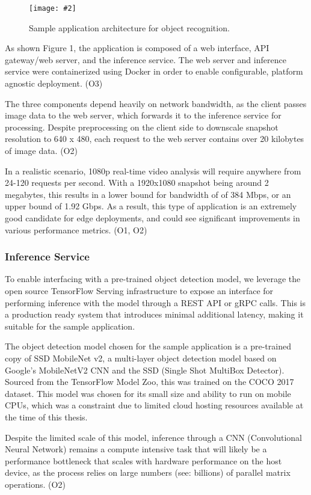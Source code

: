 \documentclass[11pt]{article}
\newcommand{\capfigure}[3][0.5] {
    \begin{figure}[H]
    \centering
    \texttt{[image: \#2]}
    \caption{#3}
    \end{figure}
}
\begin{document}
\capfigure[0.75]{images/applicationdesign1}{Sample application architecture for object recognition.}

As shown Figure 1, the application is composed of a web interface, API gateway/web server, 
and the inference service. The web server and inference service were containerized using Docker 
in order to enable configurable, platform agnostic deployment. (O3)\newline

The three components depend heavily on network bandwidth, as the client passes image data to the
web server, which forwards it to the inference service for processing. Despite preprocessing on the 
client side to downscale snapshot resolution to 640 x 480, each request to the web server contains 
over 20 kilobytes of image data. (O2) \newline

In a realistic scenario, 1080p real-time video analysis will require anywhere from 24-120 requests 
per second. With a 1920x1080 snapshot being around 2 megabytes, this results in a lower bound for 
bandwidth of of 384 Mbps, or an upper bound of 1.92 Gbps. As a result, this type of application is 
an extremely good candidate for edge deployments, and could see significant improvements in
various performance metrics. (O1, O2)

\subsubsection{Inference Service}
To enable interfacing with a pre-trained object detection model, we leverage the open source
TensorFlow Serving infrastructure to expose an interface for performing inference with the model 
through a REST API or gRPC calls. This is a production ready system that introduces minimal
additional latency, making it suitable for the sample application.\newline

The object detection model chosen for the sample application is a pre-trained copy of SSD 
MobileNet v2, a multi-layer object detection model based on Google's MobileNetV2 CNN and the SSD 
(Single Shot MultiBox Detector). Sourced from the TensorFlow Model Zoo, this was trained on the 
COCO 2017 dataset. This model was chosen for its small size and ability to run on mobile CPUs, 
which was a constraint due to limited cloud hosting resources available at the time of this thesis.
\newline

Despite the limited scale of this model, inference through a CNN (Convolutional Neural Network) 
remains a compute intensive task that will likely be a performance bottleneck that scales with 
hardware performance on the host device, as the process relies on large numbers (see: billions) 
of parallel matrix operations. (O2)\newline
\end{document}
